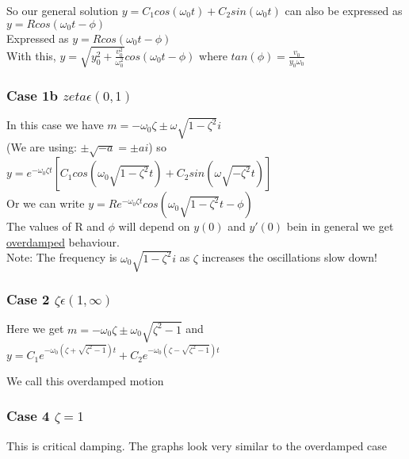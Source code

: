 \documentclass[12pt]{article}
\begin{document}
	So our general solution $y = C_1cos(\omega_0 t) + C_2sin(\omega_0 t)$ can also be expressed as $y = Rcos(\omega_0 t - \phi)$\\
	
	Expressed as $y = Rcos(\omega_0 t - \phi)$\\
	With this, $y= \sqrt{y_0^2 + \frac{v_0^2}{\omega_0^2}}cos(\omega_0 t - \phi)$ where $tan(\phi) = \frac{v_0}{y_0\omega_0}$
	
	\subsubsection*{Case 1b $zeta \epsilon (0,1)$}
	In this case we have $m = -\omega_0 \zeta \pm \omega \sqrt{1 - \zeta^2}i$\\
	(We are using: $\pm\sqrt{-a} = \pm ai$)
	so $y = e^{-\omega_0\zeta t}[C_1 cos(\omega_0 \sqrt{1-\zeta^2}t) + C_2sin(\omega\sqrt{-\zeta^2}t)]$\\
	
	Or we can write $y = Re^{-\omega_0 \zeta t}cos(\omega_0 \sqrt{1 - \zeta^2}t - \phi)$\\
	
	The values of R and $\phi$ will depend on $y(0)$ and $y'(0)$ bein in general we get \underline{overdamped} behaviour.\\
	
	Note: The frequency is $\omega_0\sqrt{1 - \zeta^2}i$ as $\zeta$ increases the oscillations slow down!\\
	
	\subsubsection*{Case 2 $\zeta \epsilon (1, \infty)$}
	Here we get $m = -\omega_0\zeta \pm \omega_0 \sqrt{\zeta^2 - 1}$ and $y = C_1 e^{-\omega_0(\zeta + \sqrt{\zeta^2 - 1})t} + C_2e^{-\omega_0(\zeta-\sqrt{\zeta^2 - 1})t}$
	
	We call this overdamped motion\\
	
	\subsubsection*{Case 4 $\zeta = 1$}
	This is critical damping. The graphs look very similar to the overdamped case\\
	
	
	
	
\end{document}
